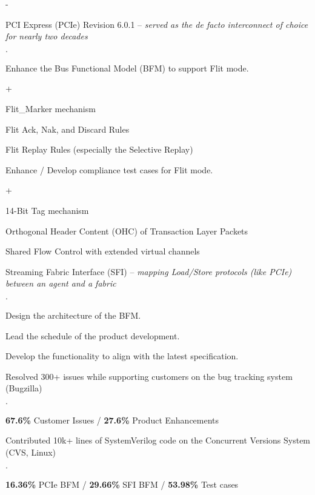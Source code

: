 \documentclass{cvclass}
\begin{document}
    \begin{plainitemize}{-}
        \item PCI Express\textsuperscript{\tiny\textregistered} (PCIe) Revision 6.0.1 -- \textit{served as the de facto interconnect of choice for nearly two decades}
        \begin{plainitemize}{\(\cdot\)}
            \item Enhance the Bus Functional Model (BFM) to support Flit mode.
            \begin{plainitemize}{+}
                \item Flit\_Marker mechanism
                \item Flit Ack, Nak, and Discard Rules
                \item Flit Replay Rules (especially the Selective Replay)
            \end{plainitemize}
            \item Enhance / Develop compliance test cases for Flit mode.
            \begin{plainitemize}{+}
                \item 14-Bit Tag mechanism
                \item Orthogonal Header Content (OHC) of Transaction Layer Packets
                \item Shared Flow Control with extended virtual channels
            \end{plainitemize}
        \end{plainitemize}
        \item Streaming Fabric Interface (SFI) -- \textit{mapping Load/Store protocols (like PCIe) between an agent and a fabric}
        \begin{plainitemize}{\(\cdot\)}
            \item Design the architecture of the BFM.
            \item Lead the schedule of the product development.
            \item Develop the functionality to align with the latest specification.
        \end{plainitemize}
        \item Resolved 300+ issues while supporting customers on the bug tracking system (Bugzilla)
        \begin{plainitemize}{\(\cdot\)}
            \item {\textbf{67.6\%} Customer Issues / \textbf{27.6\%} Product Enhancements}
        \end{plainitemize}
        \item Contributed 10k+ lines of SystemVerilog code on the Concurrent Versions System (CVS, Linux)
        \begin{plainitemize}{\(\cdot\)}
            \item \textbf{16.36\%} PCIe BFM / \textbf{29.66\%} SFI BFM / \textbf{53.98\%} Test cases
        \end{plainitemize}
    \end{plainitemize}
\end{document}
